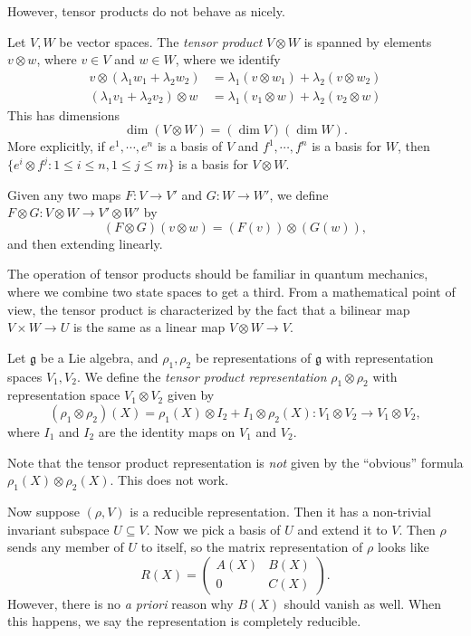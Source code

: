 \documentclass[a4paper]{article}
\begin{document}
However, tensor products do not behave as nicely.
\begin{defi}
  Let $V, W$ be vector spaces. The \emph{tensor product} $V \otimes W$ is spanned by elements $v \otimes w$, where $v \in V$ and $w \in W$, where we identify
  \begin{align*}
    v \otimes (\lambda_1 w_1 + \lambda_2 w_2) &= \lambda_1 (v \otimes w_1) + \lambda_2 (v \otimes w_2)\\
    (\lambda_1 v_1 + \lambda_2 v_2) \otimes w &= \lambda_1 (v_1 \otimes w) + \lambda_2 (v_2 \otimes w)
  \end{align*}
  This has dimensions
  \[
    \dim (V \otimes W) = (\dim V)(\dim W).
  \]
  More explicitly, if $e^1, \cdots, e^n$ is a basis of $V$ and $f^1 ,\cdots, f^n$ is a basis for $W$, then $\{e^i \otimes f^j: 1 \leq i \leq n, 1 \leq j \leq m\}$ is a basis for $V \otimes W$.

  Given any two maps $F: V \to V'$ and $G: W \to W'$, we define $F \otimes G: V \otimes W \to V' \otimes W'$ by
  \[
    (F \otimes G) (v \otimes w) = (F(v)) \otimes (G(w)),
  \]
  and then extending linearly.
\end{defi}
The operation of tensor products should be familiar in quantum mechanics, where we combine two state spaces to get a third. From a mathematical point of view, the tensor product is characterized by the fact that a bilinear map $V \times W \to U$ is the same as a linear map $V \otimes W \to V$.

\begin{defi}
  Let $\mathfrak{g}$ be a Lie algebra, and $\rho_1, \rho_2$ be representations of $\mathfrak{g}$ with representation spaces $V_1, V_2$. We define the \emph{tensor product representation} $\rho_1 \otimes \rho_2$ with representation space $V_1 \otimes V_2$ given by
  \[
    (\rho_1 \otimes \rho_2)(X) = \rho_1(X) \otimes I_2 + I_1 \otimes \rho_2(X): V_1 \otimes V_2 \to V_1 \otimes V_2,
  \]
  where $I_1$ and $I_2$ are the identity maps on $V_1$ and $V_2$.
\end{defi}

Note that the tensor product representation is \emph{not} given by the ``obvious'' formula $\rho_1(X) \otimes \rho_2(X)$. This does not work.

Now suppose $(\rho, V)$ is a reducible representation. Then it has a non-trivial invariant subspace $U \subseteq V$. Now we pick a basis of $U$ and extend it to $V$. Then $\rho$ sends any member of $U$ to itself, so the matrix representation of $\rho$ looks like
\[
  R(X) =
  \begin{pmatrix}
    A(X) & B(X)\\
    0 & C(X)
  \end{pmatrix}.
\]
However, there is no \emph{a priori} reason why $B(X)$ should vanish as well. When this happens, we say the representation is completely reducible.
\end{document}
